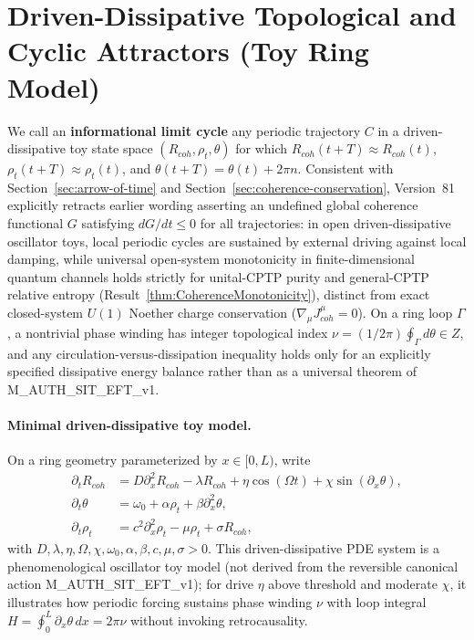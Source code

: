 \documentclass[american,11pt,letterpaper]{article}
\def\mathbb#1{#1}%
\def\mathcal#1{#1}%
\def\mathrm#1{#1}%
\def\texttt#1{#1}%
\begin{document}
\section{Driven-Dissipative Topological and Cyclic Attractors (Toy Ring Model)}
\label{appendix:topological-attractors}

We call an \textbf{informational limit cycle} any periodic trajectory $\mathcal{C}$ in a driven-dissipative toy state space $(R_{\mathrm{coh}}, \rho_t, \theta)$ for which $R_{\mathrm{coh}}(t+T) \approx R_{\mathrm{coh}}(t)$, $\rho_t(t+T) \approx \rho_t(t)$, and $\theta(t+T) = \theta(t) + 2\pi n$. Consistent with Section~\ref{sec:arrow-of-time} and Section~\ref{sec:coherence-conservation}, Version~81 explicitly retracts earlier wording asserting an undefined global coherence functional $\mathcal{G}$ satisfying $d\mathcal{G}/dt \le 0$ for all trajectories: in open driven-dissipative oscillator toys, local periodic cycles are sustained by external driving against local damping, while universal open-system monotonicity in finite-dimensional quantum channels holds strictly for unital-CPTP purity and general-CPTP relative entropy (Result~\ref{thm:CoherenceMonotonicity}), distinct from exact closed-system $U(1)$ Noether charge conservation ($\nabla_\mu J^\mu_{\mathrm{coh}} = 0$). On a ring loop $\Gamma$, a nontrivial phase winding has integer topological index $\nu = (1/2\pi)\oint_\Gamma d\theta \in \mathbb{Z}$, and any circulation-versus-dissipation inequality holds only for an explicitly specified dissipative energy balance rather than as a universal theorem of \texttt{M\_AUTH\_SIT\_EFT\_v1}.

\paragraph{Minimal driven-dissipative toy model.} On a ring geometry parameterized by $x \in [0,L)$, write
\begin{align*}
    \partial_t R_{\mathrm{coh}} &= D \partial_x^2 R_{\mathrm{coh}} - \lambda R_{\mathrm{coh}} + \eta \cos(\Omega t) + \chi \sin(\partial_x\theta), \\
    \partial_t \theta &= \omega_0 + \alpha \rho_t + \beta \partial_x^2 \theta, \\
    \partial_t \rho_t &= c^2 \partial_x^2 \rho_t - \mu \rho_t + \sigma R_{\mathrm{coh}},
\end{align*}
with $D,\lambda,\eta,\Omega,\chi,\omega_0,\alpha,\beta,c,\mu,\sigma > 0$. This driven-dissipative PDE system is a phenomenological oscillator toy model (not derived from the reversible canonical action \texttt{M\_AUTH\_SIT\_EFT\_v1}); for drive $\eta$ above threshold and moderate $\chi$, it illustrates how periodic forcing sustains phase winding $\nu$ with loop integral $H = \oint_0^L \partial_x\theta \, dx = 2\pi\nu$ without invoking retrocausality.
\end{document}
